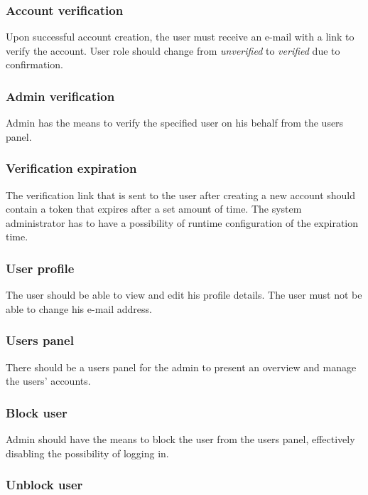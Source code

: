 \documentclass[a4paper,twoside,12pt]{book}
\begin{document}
\subsubsection{Account verification}

Upon successful account creation, the user must receive an e-mail with a link to verify the account. User role should change from \textit{unverified} to \textit{verified} due to confirmation.

\subsubsection{Admin verification}

Admin has the means to verify the specified user on his behalf from the users panel.

\subsubsection{Verification expiration}

The verification link that is sent to the user after creating a new account should contain a token that expires after a set amount of time. The system administrator has to have a possibility of runtime configuration of the expiration time.

\subsubsection{User profile}

The user should be able to view and edit his profile details. The user must not be able to change his e-mail address.

\subsubsection{Users panel}

There should be a users panel for the admin to present an overview and manage the users' accounts.

\subsubsection{Block user}

Admin should have the means to block the user from the users panel, effectively disabling the possibility of logging in.

\subsubsection{Unblock user}
\end{document}
